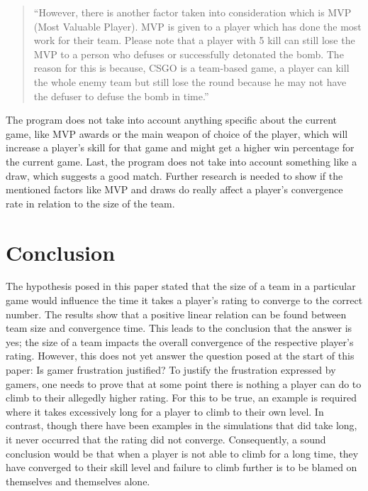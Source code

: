\documentclass[12pt]{article}
\begin{document}
\begin{quote}
	``However, there is another factor taken into consideration which is MVP (Most Valuable Player). MVP is given to a player which has done the most work for their team. Please note that a player with 5 kill can still lose the MVP to a person who defuses or successfully detonated the bomb. The reason for this is because, CSGO is a team-based game, a player can kill the whole enemy team but still lose the round because he may not have the defuser to defuse the bomb in time.''\cite{csgo}
\end{quote}

The program does not take into account anything specific about the current game, like MVP awards or the main weapon of choice of the player, which will increase a player's skill for that game and might get a higher win percentage for the current game. Last, the program does not take into account something like a draw, which suggests a good match\cite{trueskillconvergence}. Further research is needed to show if the mentioned factors like MVP and draws do really affect a player's convergence rate in relation to the size of the team.

\section{Conclusion}

The hypothesis posed in this paper stated that the size of a team in a particular game would influence the time it takes a player's rating to converge to the correct number. The results show that a positive linear relation can be found between team size and convergence time. This leads to the conclusion that the answer is yes; the size of a team impacts the overall convergence of the respective player's rating.
However, this does not yet answer the question posed at the start of this paper: Is gamer frustration justified? To justify the frustration expressed by gamers, one needs to prove that at some point there is nothing a player can do to climb to their allegedly higher rating.
For this to be true, an example is required where it takes excessively long for a player to climb to their own level. In contrast, though there have been examples in the simulations that did take long, it never occurred that the rating did not converge. Consequently, a sound conclusion would be that when a player is not able to climb for a long time, they have converged to their skill level and failure to climb further is to be blamed on themselves and themselves alone.
\end{document}
